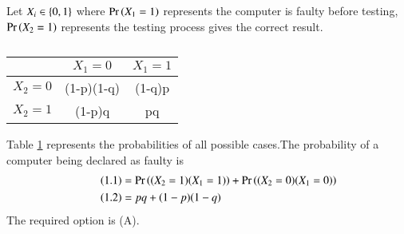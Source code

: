 
Let $X_i \in \left\{0,1\right\}$ where $\Pr\left(X_1 = 1\right)$ represents the computer is faulty before testing, $\Pr\left(X_2 = 1\right)$ represents the testing process gives the correct result.
\begin{table}[h]
\centering 
\caption{}
\begin{tabular}{|c|c|c|}
\hline
           & $X_1 = 0$  & $X_1 = 1$\\
\hline
$X_2 = 0$  & (1-p)(1-q) & (1-q)p \\
\hline
$X_2 = 1$  &  (1-p)q    &  pq \\
\hline
\end{tabular}
\label{cs2010-26:table:}
\end{table}
 
Table \ref{cs2010-26:table:} represents the probabilities of all possible cases.The probability of a computer being declared as faulty is 
\begin{align}
\tag{1.1}
     &= \Pr\left((X_2 = 1)(X_1 = 1)\right)+\Pr\left((X_2 = 0)(X_1 = 0)\right)\\
\tag{1.2}
     &= pq+(1-p)(1-q) 
\end{align}
The required option is (A).